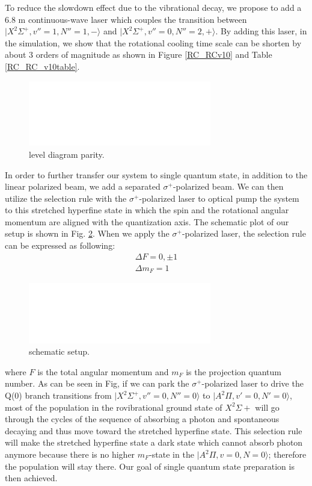 \documentclass[aip,jcp,reprint]{revtex4-1}
\begin{document}
To reduce the slowdown effect due to the vibrational decay, we propose to add a 6.8 {\micro}m continuous-wave laser which couples the transition between $\lvert X^2\Sigma^+, v''=1, N''=1, -\rangle$ and $\lvert X^2\Sigma^+, v''=0, N''=2, +\rangle$. By adding this laser, in the simulation, we show that the rotational cooling time scale can be shorten by about 3 orders of magnitude as shown in Figure \ref{RC_RCv10} and Table \ref{RC_RC_v10table}.

\begin{figure}[!h]
  \centering
  \includegraphics[width=8cm]{level_diagram_parity}
  \caption
  { level diagram parity.
}\label{level_diagram_parity}
\end{figure}

In order to further transfer our system to single quantum state, in addition to the linear polarized beam, we add a separated $\sigma^+$-polarized beam. We can then utilize the selection rule with the $\sigma^+$-polarized laser to optical pump the system to this stretched hyperfine state in which the spin and the rotational angular momentum are aligned with the quantization axis. The schematic plot of our setup is shown in Fig. \ref{schematic_setup}. When we apply the $\sigma^+$-polarized laser, the selection rule can be expressed as following:
\begin{align*}
\Delta F=0, \pm 1 \\
\Delta m_F=1
\end{align*}

\begin{figure}[!h]
  \centering
  \includegraphics[width=8cm]{schematic_setup}
  \caption
  { schematic setup.
}\label{schematic_setup}
\end{figure}

where $F$ is the total angular momentum and $m_F$ is the projection quantum number. As can be seen in {Fig}, if we can park the $\sigma^+$-polarized laser to drive the Q(0) branch transitions from $\lvert X^2\Sigma^+, v''=0, N''=0\rangle$ to $\lvert A^2\Pi, v'=0, N'=0\rangle$, most of the population in the rovibrational ground state of $X^2 \Sigma+$ will go through the cycles of the sequence of absorbing a photon and spontaneous decaying and thus move toward the stretched hyperfine state. This selection rule will make the stretched hyperfine state a dark state which cannot absorb photon anymore because there is no higher $m_F$-state in the $\lvert A^2\Pi, v=0, N=0\rangle$; therefore the population will stay there. Our goal of single quantum state preparation is then achieved. 
\end{document}
